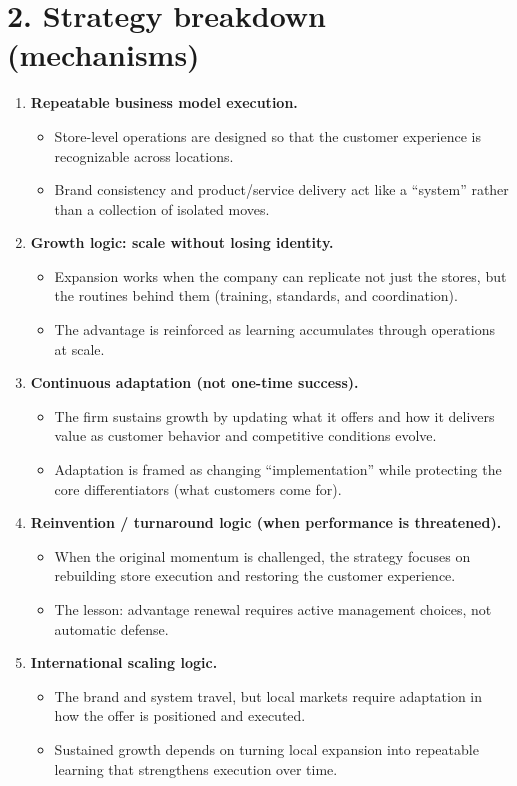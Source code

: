 \documentclass[10pt,a4paper]{article}
\begin{document}
\section*{\color{eublue}2. Strategy breakdown (mechanisms)}
\begin{enumerate}
  \item \textbf{Repeatable business model execution.}
  \begin{itemize}
    \item Store-level operations are designed so that the customer experience is recognizable across locations.
    \item Brand consistency and product/service delivery act like a ``system'' rather than a collection of isolated moves.
  \end{itemize}

  \item \textbf{Growth logic: scale without losing identity.}
  \begin{itemize}
    \item Expansion works when the company can replicate not just the stores, but the routines behind them (training, standards, and coordination).
    \item The advantage is reinforced as learning accumulates through operations at scale.
  \end{itemize}

  \item \textbf{Continuous adaptation (not one-time success).}
  \begin{itemize}
    \item The firm sustains growth by updating what it offers and how it delivers value as customer behavior and competitive conditions evolve.
    \item Adaptation is framed as changing ``implementation'' while protecting the core differentiators (what customers come for).
  \end{itemize}

  \item \textbf{Reinvention / turnaround logic (when performance is threatened).}
  \begin{itemize}
    \item When the original momentum is challenged, the strategy focuses on rebuilding store execution and restoring the customer experience.
    \item The lesson: advantage renewal requires active management choices, not automatic defense.
  \end{itemize}

  \item \textbf{International scaling logic.}
  \begin{itemize}
    \item The brand and system travel, but local markets require adaptation in how the offer is positioned and executed.
    \item Sustained growth depends on turning local expansion into repeatable learning that strengthens execution over time.
  \end{itemize}
 \end{enumerate}
\end{document}
